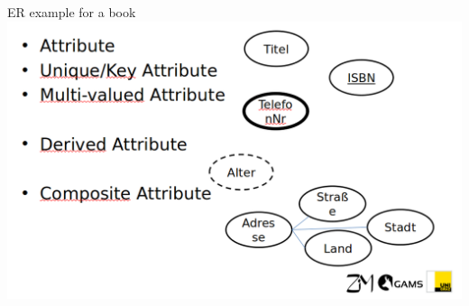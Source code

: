 \begin{frame}{ER example for a book}
\includegraphics[width=\textwidth]{img/wdh-er-bestandteile.png}

\end{frame}




